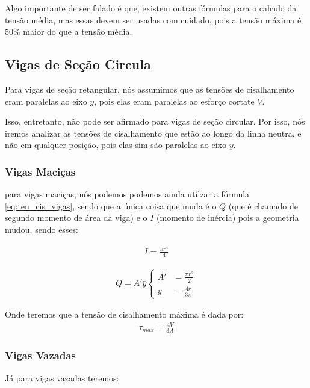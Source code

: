 \documentclass{article}
\begin{document}
Algo importante de ser falado é que, existem outras fórmulas para o calculo da tensão média, mas essas devem ser usadas com cuidado, pois a tensão máxima é $50\%$ maior do que a tensão média.

\subsection{Vigas de Seção Circula}
Para vigas de seção retangular, nós assumimos que as tensões de cisalhamento eram paralelas ao eixo $y$, pois elas eram paralelas ao esforço cortate $V$. 

Isso, entretanto, não pode ser afirmado para vigas de seção circular. Por isso, nós iremos analizar as tensões de cisalhamento que estão ao longo da linha neutra, e não em qualquer posição, pois elas sim são paralelas ao eixo $y$.

\subsubsection{Vigas Maciças}
para vigas maciças, nós podemos podemos ainda utilzar a fórmula \ref{eq:ten_cis_vigas}, sendo que a única coisa que muda é o $Q$ (que é chamado de segundo momento de área da viga) e o $I$ (momento de inércia) pois a geometria mudou, sendo esses:

\begin{minipage}{0.45\textwidth}
    \begin{align}
        I = \frac{\pi r^4}{4}
    \end{align}
\end{minipage}
\begin{minipage}{0.45\textwidth}
    \begin{align}
        Q = A' \bar y \begin{cases}
            A' &=  \frac{\pi r^2}{2} \\
            \bar y &= \frac{4r}{3\pi}
        \end{cases}
    \end{align}
\end{minipage}

\vspace{10px}
Onde teremos que a tensão de cisalhamento máxima é dada por:
\begin{align}
    \tau_{max} = \frac{4V}{3A}
\end{align}

\subsubsection{Vigas Vazadas}
Já para vigas vazadas teremos:
\end{document}
